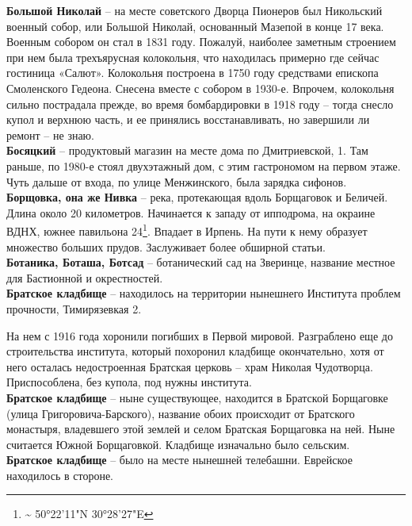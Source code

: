 \textbf{Большой Николай} – на месте советского Дворца Пионеров был Никольский военный собор, или Большой Николай, основанный Мазепой в конце 17 века. Военным собором он стал в 1831 году. Пожалуй, наиболее заметным строением при нем была трехъярусная колокольня, что находилась примерно где сейчас гостиница «Салют». Колокольня построена в 1750 году средствами епископа Смоленского Гедеона. Снесена вместе с собором в 1930-е. Впрочем, колокольня сильно пострадала прежде, во время бомбардировки в 1918 году – тогда снесло купол и верхнюю часть, и ее принялись восстанавливать, но завершили ли ремонт – не знаю.\\

\textbf{Босяцкий} – продуктовый магазин на месте дома по Дмитриевской, 1. Там раньше, по 1980-е стоял двухэтажный дом, с этим гастрономом на первом этаже. Чуть дальше от входа, по улице Менжинского, была зарядка сифонов.\\

\textbf{Борщовка, она же Нивка} – река, протекающая вдоль Борщаговок и Беличей. Длина около 20 километров. Начинается к западу от ипподрома, на окраине ВДНХ, южнее павильона 24\footnote{\textasciitilde{} 50°22'11"N 30°28'27"E}. Впадает в Ирпень. На пути к нему образует множество больших прудов. Заслуживает более обширной статьи.\\

\textbf{Ботаника, Боташа, Ботсад} – ботанический сад на Зверинце, название местное для Бастионной и окрестностей.\\

\textbf{Братское кладбище} – находилось на территории нынешнего Института проблем прочности, Тимирязевкая 2. 

На нем с 1916 года хоронили погибших в Первой мировой. Разграблено еще до строительства института, который похоронил кладбище окончательно, хотя от него осталась недостроенная Братская церковь – храм Николая Чудотворца. Приспособлена, без купола, под нужны института.\\

\textbf{Братское кладбище} – ныне существующее, находится в Братской Борщаговке (улица Григо\-ровича-Барского), название обоих происходит от Братского монастыря, владевшего этой землей и селом Братская Борщаговка на ней. Ныне считается Южной Борщаговкой. Кладбище изначально было сельским.\\

\textbf{Братское кладбище} – было на месте нынешней телебашни. Еврейское находилось в стороне.\\

